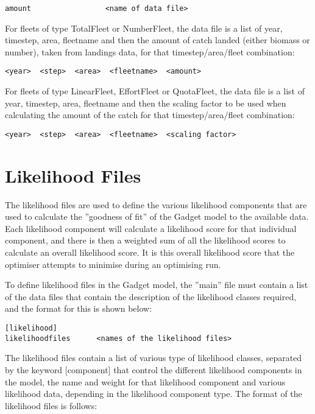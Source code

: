 \documentclass[10pt,twoside]{book}
\begin{document}
{\small\begin{verbatim}
amount                 <name of data file>
\end{verbatim}}

For fleets of type TotalFleet or NumberFleet, the data file is a list of year, timestep, area, fleetname and then the amount of catch landed (either biomass or number), taken from landings data, for that timestep/area/fleet combination:

{\small\begin{verbatim}
<year>  <step>  <area>  <fleetname>  <amount>
\end{verbatim}}

For fleets of type LinearFleet, EffortFleet or QuotaFleet, the data file is a list of year, timestep, area, fleetname and then the scaling factor to be used when calculating the amount of the catch for that timestep/area/fleet combination:

{\small\begin{verbatim}
<year>  <step>  <area>  <fleetname>  <scaling factor>
\end{verbatim}}

\chapter{Likelihood Files}\label{chap:like}
The likelihood files are used to define the various likelihood components that are used to calculate the ''goodness of fit'' of the Gadget model to the available data.  Each likelihood component will calculate a likelihood score for that individual component, and there is then a weighted sum of all the likelihood scores to calculate an overall likelihood score.  It is this overall likelihood score that the optimiser attempts to minimise during an optimising run.

\bigskip
To define likelihood files in the Gadget model, the ''main'' file must contain a list of the data files that contain the description of the likelihood classes required, and the format for this is shown below:

{\small\begin{verbatim}
[likelihood]
likelihoodfiles      <names of the likelihood files>
\end{verbatim}}

The likelihood files contain a list of various type of likelihood classes, separated by the keyword [component] that control the different likelihood components in the model, the name and weight for that likelihood component and various likelihood data, depending in the likelihood component type.  The format of the likelihood files is follows:
\end{document}
